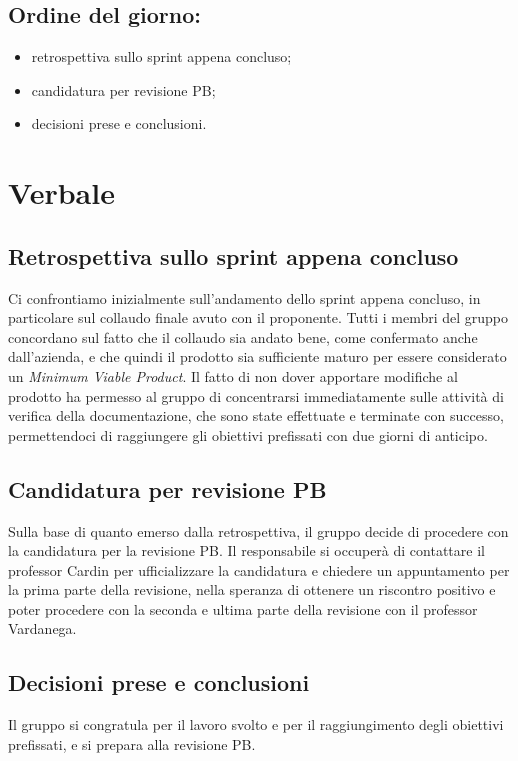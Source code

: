 \documentclass[italian,12pt]{article}
\begin{document}
\subsection*{Ordine del giorno:}
\begin{itemize}
	\item retrospettiva sullo sprint appena concluso;
	\item candidatura per revisione PB;
	\item decisioni prese e conclusioni.
\end{itemize}


\newpage

\section{Verbale}

\subsection{Retrospettiva sullo sprint appena concluso}
Ci confrontiamo inizialmente sull'andamento dello sprint appena concluso, in particolare sul collaudo finale avuto con il proponente. Tutti i membri del gruppo concordano sul fatto che il collaudo sia andato bene, come confermato anche dall'azienda, e che quindi il prodotto sia sufficiente maturo per essere considerato un \textit{Minimum Viable Product}. Il fatto di non dover apportare modifiche al prodotto ha permesso al gruppo di concentrarsi immediatamente sulle attività di verifica della documentazione, che sono state effettuate e terminate con successo, permettendoci di raggiungere gli obiettivi prefissati con due giorni di anticipo.

\subsection{Candidatura per revisione PB}
Sulla base di quanto emerso dalla retrospettiva, il gruppo decide di procedere con la candidatura per la revisione PB. Il responsabile si occuperà di contattare il professor Cardin per ufficializzare la candidatura e chiedere un appuntamento per la prima parte della revisione, nella speranza di ottenere un riscontro positivo e poter procedere con la seconda e ultima parte della revisione con il professor Vardanega.

\subsection{Decisioni prese e conclusioni}
Il gruppo si congratula per il lavoro svolto e per il raggiungimento degli obiettivi prefissati, e si prepara alla revisione PB.
\end{document}
